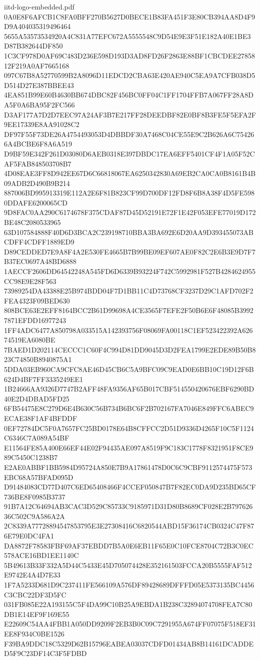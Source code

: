 \begin{filecontents*}[overwrite]{iitd-logo-embedded.pdf}
0A0E8F6AFCB1C8FA0BFF270B5627D0BECE1B83FA451F3E80CB394AA8D4F9D9A404035319496464
5655A53573534920A4C831A77EFC672A5555548C9D54E9E3F51E182A40E1BE3D87B382644DF850
1C3CF978D0AF69C483D236E598D193D3AD8FD26F2863E88BF1CBCDEE2785812F219A0AF7665168
097C67B8A52770599B2A8096D11EDCD2CBA63E420AE940C5EA9A7CFB038D5D514D27E387BBEE43
4EA851B99E60B4630BB674DBC82F456BC0FF04C1FF1704FFB7A067FF28A8DA5F0A6BA95F2FC566
D3AF177A7D2D7EEC97A24AF3B7E217FF28DEEDBF82E0BF8B3FE5F5EFA2F9EE17339E8AA91028C2
DF97F55F73DE26A4754493053D4DBBDF30A7468C04CE55E9C2B626A6C754266A4BCBE6F8A6A519
D9BF59E342F261D03080D6AEB0318E397DBDC17EA6EFF5401CF4F1A05F52CAF5FAB848503708B7
4D08EAE3FF8D942EE67D6C66818067EA6250342830A69EB2CA0CA0B8161B4B09ADB2D490B9B214
887006BD995913319E112A2E6F81B823CF99D700DF12FD8F6B8A38F4D5FE5980DDAFE6200065CD
9D8FAC0AA290C6174678F375CDAF87D45D52191E72F1E42F053EFE77019D172BE48C2080533965
63D107584888F40D6D3BCA2C239198710BBA3BA692E6D20AA9D393455073ABCDFF4CDFF1889ED9
D89CEDDED7E9A8F4A2E530FE4665B7B99BE09EF607AE0F82C2E6B3E9D7F7B37EC0697A48BD6888
1AECCF2606DD64542248A545FD6D6339B93224F742C5992981F527B4284624955CC98E9E28F563
73989254DA43388E25B974BDD04F7D1BB11C4D73768CF3237D29C1AFD702F2FEA4323F09BED630
808BCE63E2EFF8164BCC2B61D99698A4CE3565F7EFE2F50B6E6F48085B39927871EFDD16977243
1FF4ADC6477A850798A033515A142393756F08069FA00118C1EF523422392A62674519EA6080BE
7BAED1D202114CECCC1C60F4C994D81DD9045D3D2FEA1799E2EDE89B50B823C74850B8940875A1
5DDA03EB960CA9CFC8AE46D45CB6C5A9BFC09C9EAD0E6BB10C19D12F6B624D4BF7FF3335249EE1
1B24666AA9326D7747B2AFF48FA9356AF65B017CBF514550420676EBF6290BD40E2D4DBAD5FD25
6FB54475E8C279D6E4B630C56B734B6BC6F2B702167FA7046E849FFC6ABEC9ECAE38F1AF4BFDDF
0EF72784DC5F0A7657FC25BD0178E64B8CFFCC2D51D9336D4265F10C5F1124C6346C7A089A54BF
E11564FE85A400E66EF44E02F94435AE097A8519F9C183C1778F8321951F8CE989C5450C1238B7
E2AE0ABBF1BB5984D95724A850E7B9A17861478D0C6C9CBF9112574475F573EBC68A57BFAD095D
D91484083CD77D407C6ED65408466F4CCEF050847B7F82EC0DA9D235BD65CF736BE8F0985B3737
91B7A12C64694AB3CAC3D529C85733C9185971D31D80B8689CF028E2B79762636C502C9A586A2A
2C8339A77728894547853795E3E27308416C6820544ABD15F36174CB0324C47F876E79E0DC4FA1
DA8872F78583FBF69AF37EBDD7B5A0E6EB11F65E0C10FCE8704C72B3C0EC578ACE16BD1EE1140C
5B49613B33F332A5D44C5433E45D705074428E352161503FCCA20B5555FAF512E9742E4A4D7E33
1F7A5233D681D9C237411FE566109A576DF89428689DFFFD05E5373135BC4456C3CBC22DF3D5FC
031FB085E22A193155C5F4DA99C10B25A9EBDA1B238C32894074708FEA7C80DB1E14EF9F169E55
E22609C54AA4FBB1A050DD9209F2EB3B0C09C7291955A674FF07075F518EF31EE8F934C0BE1526
F39BA9DDC18C5329D62B15796EABEA03037CDFD01434AB8B14161DCADDED5F9C23DF14C3F5FDBD

\end{filecontents*}
